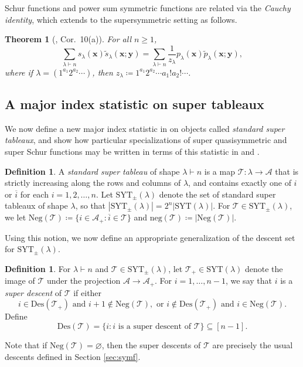 \documentclass[11pt]{article}
\newtheorem{thm}[theo]{Theorem}
\theoremstyle{definition}
\newtheorem{defi}[theo]{Definition}
\numberwithin{equation}{section}
\newcommand\Des{\mathrm{Des}}
\newcommand\Neg{\mathrm{Neg}}
\newcommand\negg{\mathrm{neg}}
\newcommand\SYT{\mathrm{SYT}}
\newcommand\xb{\mathbf{x}}
\newcommand\yb{\mathbf{y}}
\newcommand\Acal{\mathcal{A}}
\newcommand\ptil{\tilde{p}}
\newcommand\stil{\tilde{s}}
\begin{document}
Schur functions and power sum symmetric functions are related via the \emph{Cauchy identity}, which extends to the supersymmetric setting as follows.
\begin{thm}[\cite{BRem}, Cor.~10(a)]\label{lem:s-p}
    For all $n \ge 1$,
    \[
    \sum_{\lambda \vdash n} s_\lambda(\xb) \stil_\lambda(\xb;\yb) = \sum_{\lambda \vdash n} \frac{1}{z_\lambda} p_\lambda(\xb) \ptil_\lambda(\xb;\yb),
    \]
    where if $\lambda = (1^{a_1}2^{a_2} \cdots)$, then $z_\lambda \coloneqq 1^{a_1}2^{a_2} \cdots a_1!a_2! \cdots$.
\end{thm}

\subsection{A major index statistic on super tableaux}\label{sec:super-des} We now define a new major index statistic in  on objects called \emph{standard super tableaux}, and show how particular specializations of super quasisymmetric and super Schur functions may be written in terms of this statistic in  and .
\begin{defi}
    A \emph{standard super tableau} of shape $\lambda \vdash n$ is a map $\mathcal{T} : \lambda \to \Acal$ that is strictly increasing along the rows and columns of $\lambda$, and contains exactly one of $i$ or $\overline{i}$ for each $i = 1, 2, \ldots, n$. Let $\SYT_\pm(\lambda)$ denote the set of standard super tableaux of shape $\lambda$, so that $|\SYT_\pm(\lambda)| = 2^n|\SYT(\lambda)|$. For $\mathcal{T} \in \SYT_\pm(\lambda)$, we let $\Neg(\mathcal{T}) \coloneqq \{ i \in \Acal_+ : \overline{i} \in \mathcal{T} \}$ and $\negg(\mathcal{T}) \coloneqq |\Neg(\mathcal{T})|$.
\end{defi}
Using this notion, we now define an appropriate generalization of the descent set for $\SYT_\pm(\lambda)$.
\begin{defi}
For $\lambda \vdash n$ and $\mathcal{T} \in \SYT_\pm(\lambda)$, let $\mathcal{T}_+ \in \SYT(\lambda)$ denote the image of $\mathcal{T}$ under the projection $\Acal \to \Acal_+$. For $i = 1, \ldots, n-1$, we say that $i$ is a \emph{super descent} of $\mathcal{T}$ if either 
\[
i \in \Des(\mathcal{T}_+) \text{ and } i+1 \not\in \Neg(\mathcal{T}), \text{ or } i \not\in \Des(\mathcal{T}_+) \text{ and } i \in \Neg(\mathcal{T}).
\]
Define
\[
\Des(\mathcal{T}) = \{ i : i \text{ is a super descent of } \mathcal{T} \} \subseteq [n-1].
\]
\end{defi}
Note that if $\Neg(\mathcal{T}) = \varnothing$, then the super descents of $\mathcal{T}$ are precisely the usual descents defined in Section \ref{sec:symf}.
\end{document}
